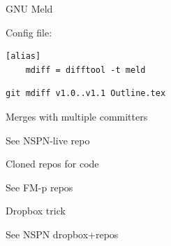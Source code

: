 \begin{frame}[fragile]{GNU Meld}

Config file:
\begin{verbatim}
[alias]
    mdiff = difftool -t meld
\end{verbatim}
  
\begin{verbatim}
git mdiff v1.0..v1.1 Outline.tex
\end{verbatim}

\end{frame}



\begin{frame}{Merges with multiple committers}
  
  See NSPN-live repo

\end{frame}

\begin{frame}{Cloned repos for code}
  
  See FM-p repos

\end{frame}


\begin{frame}{Dropbox trick}
  
  See NSPN dropbox+repos

\end{frame}
















